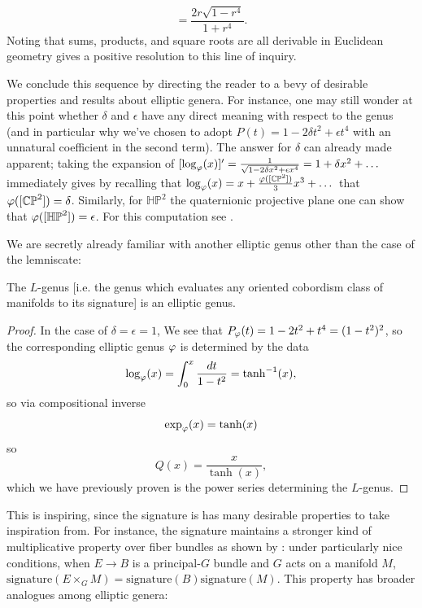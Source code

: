 \[ =\frac{2r \sqrt{1 - r^4} }{1 + r^4}.\]
Noting that sums, products, and square roots are all derivable in Euclidean geometry gives a positive resolution to this line of inquiry. 

We conclude this sequence by directing the reader to a bevy of desirable properties and results about elliptic genera. For instance, one may still wonder at this point whether $\delta$ and $\epsilon$ have any direct meaning with respect to the genus (and in particular why we've chosen to adopt $P(t) = 1 - 2 \delta t^2 + \epsilon t^4$ with an unnatural coefficient in the second term). The answer for $\delta$ can already made apparent; taking the expansion of $[\log_{\varphi} (x)]' = \frac{1}{\sqrt{1 - 2 \delta x^2 + \epsilon x^4}} = 1 + \delta x^2 + \dots$ immediately gives by recalling that $\log_\varphi (x) = x + \frac{\varphi([\mathbb{CP}^2])}{3} x^3 + \dots $ that $\varphi ([\mathbb{CP}^2]) = \delta$. Similarly, for $\mathbb{HP}^2$ the quaternionic projective plane one can show that $\varphi([\mathbb{HP}^2]) = \epsilon$. For this computation see \cite{MMF}.  
  
We are secretly already familiar with another elliptic genus other than the case of the lemniscate:

\begin{proposition}
    The $L$-genus [i.e. the genus which evaluates any oriented cobordism class of manifolds to its signature] is an elliptic genus.
\end{proposition}

\begin{proof}
    In the case of $\delta = \epsilon = 1$, We see that $P_\varphi(t) = 1 - 2 t^2 + t^4 = (1 - t^2)^2$, so the corresponding elliptic genus $\varphi$ is determined by the data
\[\log_{\varphi}(x) = \int_0^x \frac{dt}{1 - t^2} = \tanh^{-1}(x),\]
so via compositional inverse
\[  \exp_\varphi (x) = \tanh(x) \] so 
\[ Q(x) = \frac{x}{\tanh(x)},\]
which we have previously proven is the power series determining the $L$-genus.
\end{proof}

This is inspiring, since the signature is has many desirable properties to take inspiration from. For instance, the signature maintains a stronger kind of multiplicative property over fiber bundles as shown by \cite{Chern_Hirzebruch_Serre_1957}: under particularly nice conditions, when $E \to B$ is a principal-$G$ bundle and $G$ acts on a manifold $M$, $\text{signature}(E \times_G M) = \text{signature}(B) \text{signature}(M) $. This property has broader analogues among elliptic genera:

